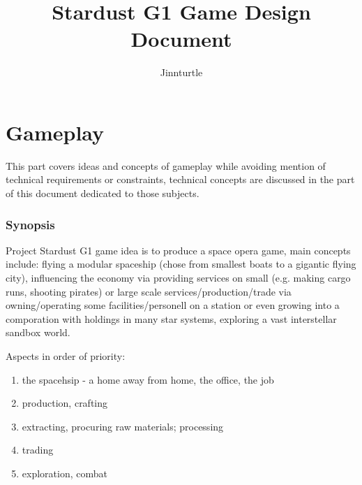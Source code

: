 \documentclass[a4paper,10pt]{article}
\begin{document}
\newlength{\tabcolsepDefault}
\setlength{\tabcolsepDefault}{\tabcolsep}




\newcommand{\textbi}[1]{\textbf{\textit{#1}}}

\newcommand{\projName}{Stardust G1}


\title{Stardust G1 Game Design Document}
\author{Jinnturtle}

\maketitle
\tableofcontents



\newpage
\part{Gameplay}

This part covers ideas and concepts of gameplay while avoiding mention of
technical requirements or constraints, technical concepts are discussed in
the part of this document dedicated to those subjects.

\section{Synopsis}
\begin{multicols}{2}
Project \projName{} game idea is to produce a space opera game, main concepts
include: flying a modular spaceship (chose from smallest boats to a gigantic
flying city), influencing the economy via providing services on small (e.g.
making cargo runs, shooting pirates) or large scale services/production/trade
via owning/operating some facilities/personell on a station or even growing into
a comporation with holdings in many star systems, exploring a vast interstellar
sandbox world.

Aspects in order of priority:
\begin{enumerate}
\item the spacehsip - a home away from home, the office, the job
\item production, crafting
\item extracting, procuring raw materials; processing
\item trading
\item exploration, combat
\end{enumerate}

\end{multicols}
\end{document}
